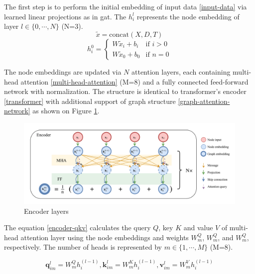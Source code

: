     The first step is to perform the initial embedding of input data \ref{input-data} via learned linear projections as in \gls{gat}. The $h_{i}^{l}$ represents the node embedding of layer $l \in \{0, \cdots, N\}$ (N=3).
    \begin{equation}
        \widetilde{x} = \text{concat}(X, D, T)
    \end{equation}
    \begin{equation}
        h_{i}^{0} = \begin{cases} W \widetilde{x}_i + b_i &\mbox{if } i > 0 \\ W \widetilde{x}_0 + b_0 & \mbox{if } n = 0 \end{cases}
    \end{equation}
    
    The node embeddings are updated via $N$ attention layers, each containing multi-head attention \ref{multi-head-attention} (M=8) and a fully connected feed-forward network with normalization. The structure is identical to transformer's encoder \ref{transformer} with additional support of graph structure \ref{graph-attention-network} as shown on Figure \ref{fig:encoder-diagram}.
    
    \begin{figure}[ht]
        \centering
        \includegraphics[width=1.0\textwidth]{resources/vrptw-ai/encoder-diagram.png}
        \caption{Encoder layers \cite{attention-route}}
        \label{fig:encoder-diagram}
    \end{figure}
    
    The equation \ref{encoder-qkv} calculates the query $Q$, key $K$ and value $V$ of multi-head attention layer using the node embeddings and weights $W_m^Q$, $W_m^Q$, and $W_m^Q$, respectively. The number of heads is represented by $m \in \{1, \cdots, M\}$ (M=8).
    
    \begin{equation}\label{encoder-qkv}
        \textbf{q}_{im}^l = W_m^Q h_i^(l-1), \textbf{k}_{im}^l = W_m^K h_i^(l-1), \textbf{v}_{im}^l = W_m^V h_i^(l-1)
    \end{equation}
    
